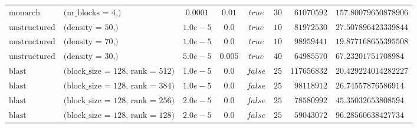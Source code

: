 \begin{table}[h!]
\begin{tabular}{llcccrrl}
$\text{monarch}$ & $\text{(nr\_blocks = 4,)}$ & $0.0001$ & $0.01$ & $true$ & $30$ & $61070592$ & $157.80079650878906$\\
$\text{unstructured}$ & $\text{(density = 50,)}$ & $1.0e-5$ & $0.0$ & $true$ & $10$ & $81972530$ & $27.507896423339844$\\
$\text{unstructured}$ & $\text{(density = 70,)}$ & $1.0e-5$ & $0.0$ & $true$ & $10$ & $98959441$ & $19.877168655395508$\\
$\text{unstructured}$ & $\text{(density = 30,)}$ & $5.0e-5$ & $0.005$ & $true$ & $40$ & $64985570$ & $67.23201751708984$\\
$\text{blast}$ & $\text{(block\_size = 128, rank = 512)}$ & $1.0e-5$ & $0.0$ & $false$ & $25$ & $117656832$ & $20.429224014282227$\\
$\text{blast}$ & $\text{(block\_size = 128, rank = 384)}$ & $1.0e-5$ & $0.0$ & $false$ & $25$ & $98118912$ & $26.74557876586914$\\
$\text{blast}$ & $\text{(block\_size = 128, rank = 256)}$ & $2.0e-5$ & $0.0$ & $false$ & $25$ & $78580992$ & $45.35032653808594$\\
$\text{blast}$ & $\text{(block\_size = 128, rank = 128)}$ & $2.0e-5$ & $0.0$ & $false$ & $25$ & $59043072$ & $96.28560638427734$\\
\end{tabular}

\end{table}
